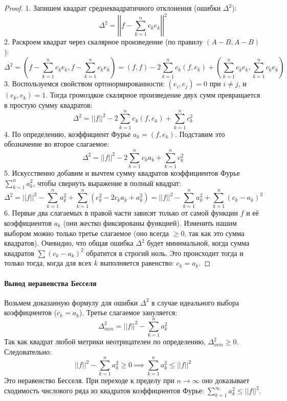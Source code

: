 \begin{proof}
1. Запишем квадрат среднеквадратичного отклонения (ошибки $\Delta^2$):
$$ \Delta^2 = \left|\left|f - \sum_{k=1}^n c_k e_k\right|\right|^2 $$
2. Раскроем квадрат через скалярное произведение (по правилу $(A-B, A-B)$):
$$ \Delta^2 = \left(f - \sum_{k=1}^n c_k e_k, f - \sum_{k=1}^n c_k e_k\right) = (f, f) - 2\sum_{k=1}^n c_k(f, e_k) + \left(\sum_{k=1}^n c_k e_k, \sum_{k=1}^n c_k e_k\right) $$
3. Воспользуемся свойством ортонормированности: $(e_i, e_j) = 0$ при $i \ne j$, и $(e_k, e_k) = 1$. Тогда громоздкое скалярное произведение двух сумм превращается в простую сумму квадратов:
$$ \Delta^2 = ||f||^2 - 2\sum_{k=1}^n c_k (f, e_k) + \sum_{k=1}^n c_k^2 $$
4. По определению, коэффициент Фурье $a_k = (f, e_k)$. Подставим это обозначение во второе слагаемое:
$$ \Delta^2 = ||f||^2 - 2\sum_{k=1}^n c_k a_k + \sum_{k=1}^n c_k^2 $$
5. Искусственно добавим и вычтем сумму квадратов коэффициентов Фурье $\sum_{k=1}^n a_k^2$, чтобы свернуть выражение в полный квадрат:
$$ \Delta^2 = ||f||^2 - \sum_{k=1}^n a_k^2 + \sum_{k=1}^n (c_k^2 - 2c_k a_k + a_k^2) = ||f||^2 - \sum_{k=1}^n a_k^2 + \sum_{k=1}^n (c_k - a_k)^2 $$
6. Первые два слагаемых в правой части зависят только от самой функции $f$ и её коэффициентов $a_k$ (они жестко фиксированы функцией). Изменить нашим выбором можно только третье слагаемое (оно всегда $\ge 0$, так как это сумма квадратов). 
Очевидно, что общая ошибка $\Delta^2$ будет минимальной, когда сумма квадратов $\sum (c_k - a_k)^2$ обратится в строгий ноль. Это происходит тогда и только тогда, когда для всех $k$ выполняется равенство: $c_k = a_k$.
\end{proof}

\paragraph{Вывод неравенства Бесселя}
Возьмем доказанную формулу для ошибки $\Delta^2$ в случае идеального выбора коэффициентов ($c_k = a_k$). Третье слагаемое зануляется:
$$ \Delta_{min}^2 = ||f||^2 - \sum_{k=1}^n a_k^2 $$
Так как квадрат любой метрики неотрицателен по определению, $\Delta_{min}^2 \ge 0$. Следовательно:
$$ ||f||^2 - \sum_{k=1}^n a_k^2 \ge 0 \implies \sum_{k=1}^n a_k^2 \le ||f||^2 $$
Это неравенство Бесселя. При переходе к пределу при $n \to \infty$ оно доказывает сходимость числового ряда из квадратов коэффициентов Фурье: $\sum_{k=1}^\infty a_k^2 \le ||f||^2$.


